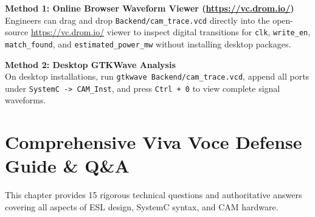 \documentclass[11pt,a4paper,oneside]{report}
\begin{document}
\noindent\textbf{Method 1: Online Browser Waveform Viewer (\url{https://vc.drom.io/})}\\
Engineers can drag and drop \texttt{Backend/cam\_trace.vcd} directly into the open-source \url{https://vc.drom.io/} viewer to inspect digital transitions for \texttt{clk}, \texttt{write\_en}, \texttt{match\_found}, and \texttt{estimated\_power\_mw} without installing desktop packages.

\noindent\textbf{Method 2: Desktop GTKWave Analysis}\\
On desktop installations, run \texttt{gtkwave Backend/cam\_trace.vcd}, append all ports under \texttt{SystemC -> CAM\_Inst}, and press \texttt{Ctrl + 0} to view complete signal waveforms.

\chapter[Viva Voce Defense Guide]{Comprehensive Viva Voce Defense Guide \& Q\&A}

This chapter provides 15 rigorous technical questions and authoritative answers covering all aspects of ESL design, SystemC syntax, and CAM hardware.
\end{document}

